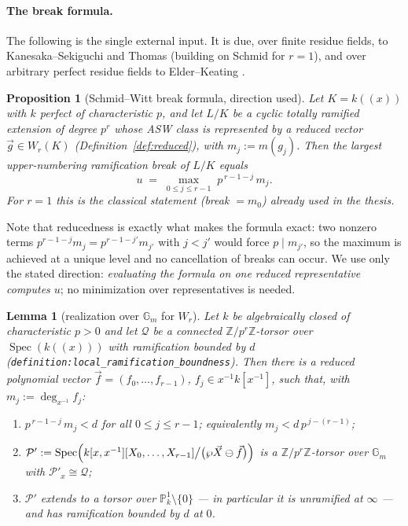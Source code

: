 \documentclass[11pt]{article}
\newcommand{\cP}{\mathcal{P}}
\newcommand{\cQ}{\mathcal{Q}}
\newcommand{\Z}{\mathbb{Z}}
\newcommand{\bG}{\mathbb{G}}
\newcommand{\bP}{\mathbb{P}}
\DeclareMathOperator{\Spec}{Spec}
\newcommand{\AS}{\wp}
\newcommand{\vf}{\vec f}
\newcommand{\vX}{\vec X}
\theoremstyle{plain}
\newtheorem{lemma}[theorem]{Lemma}
\newtheorem{prop}[theorem]{Proposition}
\theoremstyle{definition}
\begin{document}
\paragraph{The break formula.}
The following is the single external input. It is due, over finite residue fields, to
Kanesaka--Sekiguchi \cite{KanesakaSekiguchi1979} and Thomas \cite{Thomas2005}
(building on Schmid \cite{Schmid1937} for $r=1$), and over arbitrary perfect residue
fields to Elder--Keating \cite{ElderKeating2025}.

\begin{prop}[Schmid--Witt break formula, direction used]\label{prop:break}
Let $K=k((x))$ with $k$ perfect of characteristic $p$, and let $L/K$ be a cyclic totally
ramified extension of degree $p^r$ whose ASW class is represented by a \emph{reduced}
vector $\vec g\in W_r(K)$ (Definition~\ref{def:reduced}), with $m_j:=m(g_j)$. Then the
largest upper-numbering ramification break of $L/K$ equals
\[
u \;=\; \max_{0\le j\le r-1}\; p^{\,r-1-j}\,m_j .
\]
For $r=1$ this is the classical statement (break $=m_0$) already used in the thesis.
\end{prop}

Note that reducedness is exactly what makes the formula exact: two nonzero terms
$p^{r-1-j}m_j=p^{r-1-j'}m_{j'}$ with $j<j'$ would force $p\mid m_{j'}$, so the maximum is
achieved at a unique level and no cancellation of breaks can occur. We use only the
stated direction: \emph{evaluating the formula on one reduced representative computes
$u$}; no minimization over representatives is needed.

\begin{lemma}[realization over $\bG_m$ for $W_r$]\label{lem:realization-Wr}
Let $k$ be algebraically closed of characteristic $p>0$ and let $\cQ$ be a
\emph{connected} $\Z/p^r\Z$-torsor over $\Spec(k((x)))$ with ramification bounded by $d$
(\texttt{definition:local\_ramification\_boundness}). Then there is a reduced polynomial
vector $\vf=(f_0,\dots,f_{r-1})$, $f_j\in x^{-1}k[x^{-1}]$, such that, with
$m_j:=\deg_{x^{-1}}f_j$:
\begin{enumerate}
  \item \label{it:polebound} $p^{\,r-1-j}\,m_j<d$ for all $0\le j\le r-1$; equivalently
        $m_j<d\,p^{\,j-(r-1)}$;
  \item \label{it:torsor} $\cP':=\Spec\Bigl(k[x,x^{-1}][X_0,\dots,X_{r-1}]\big/
        \bigl(\AS\vX\ominus\vf\bigr)\Bigr)$ is a $\Z/p^r\Z$-torsor over $\bG_m$ with
        $\cP'_x\cong\cQ$;
  \item \label{it:infty} $\cP'$ extends to a torsor over $\bP^1_k\setminus\{0\}$ --- in
        particular it is unramified at $\infty$ --- and has ramification bounded by $d$
        at $0$.
\end{enumerate}
\end{lemma}
\end{document}
